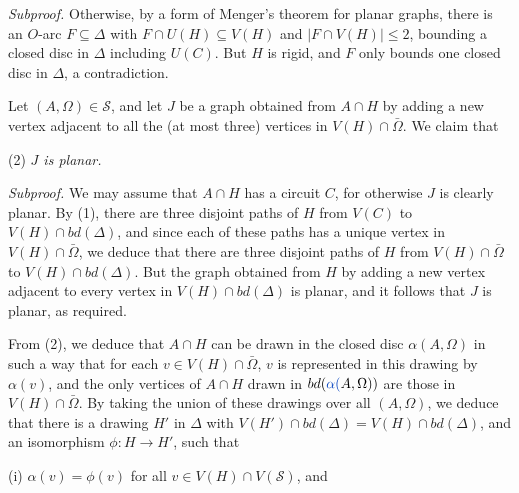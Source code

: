 \textit{Subproof.} Otherwise, by a form of Menger's theorem for planar graphs, there is an $O$-arc $F \subseteq \Delta$ with $F \cap U(H) \subseteq V(H)$ and $|F \cap V(H)| \le 2$, bounding a closed disc in $\Delta$ including $U(C)$. But $H$ is rigid, and $F$ only bounds one closed disc in $\Delta$, a contradiction.

Let $(A, \Omega) \in \mathscr{S}$, and let $J$ be a graph obtained from $A \cap H$ by adding a new vertex adjacent to all the (at most three) vertices in $V(H) \cap \bar{\Omega}$. We claim that

\hspace*{12pt}(2) \textit{$J$ is planar.}

\textit{Subproof.} We may assume that $A \cap H$ has a circuit $C$, for otherwise $J$ is clearly planar. By (1), there are three disjoint paths of $H$ from $V(C)$ to $V(H) \cap bd(\Delta)$, and since each of these paths has a unique vertex in $V(H) \cap \bar{\Omega}$, we deduce that there are three disjoint paths of $H$ from $V(H) \cap \bar{\Omega}$ to $V(H) \cap bd(\Delta)$. But the graph obtained from $H$ by adding a new vertex adjacent to every vertex in $V(H) \cap bd(\Delta)$ is planar, and it follows that $J$ is planar, as required.

From (2), we deduce that $A \cap H$ can be drawn in the closed disc $\alpha(A, \Omega)$ in such a way that for each $v \in V(H) \cap \bar{\Omega}$, $v$ is represented in this drawing by $\alpha(v)$, and the only vertices of $A \cap H$ drawn in $bd(\fix{\alpha(}A, \Omega))$ are those in $V(H) \cap \bar{\Omega}$. By taking the union of these drawings over all $(A, \Omega)$, we deduce that there is a drawing $H'$ in $\Delta$ with $V(H') \cap bd(\Delta) = V(H) \cap bd(\Delta)$, and an isomorphism $\phi : H \to H'$, such that

\hspace*{12pt}(i) $\alpha(v) = \phi(v)$ for all $v \in V(H) \cap V(\mathscr{S})$, and

